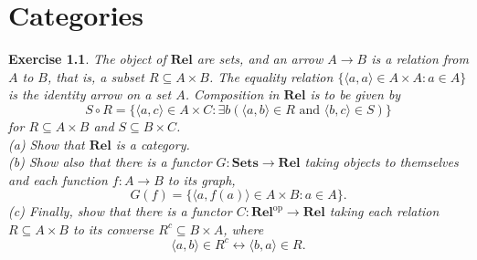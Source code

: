 \documentclass[a4paper, 11pt]{book}
\theoremstyle{plain}
\newtheorem{exercise}{Exercise}[chapter]
\theoremstyle{plain}
\newcommand{\mb}{\mathbf}
\newcommand{\arr}{\rightarrow}
\newcommand{\op}{\text{op}}
\begin{document}
\chapter{Categories}
  \label{sec:ex1ch1}
  \begin{exercise}
    The object of $\mb{Rel}$ are sets, and an arrow $A \arr B$ is a relation from $A$ to $B$, that is, a subset $R \subseteq A \times B$. The equality relation $\{ \langle a, a \rangle \in A \times A: a \in A \}$ is the identity arrow on a set $A$. Composition in $\mb{Rel}$ is to be given by $$ S \circ R=\{ \langle a , c \rangle \in A \times C: \exists b (\langle a,b \rangle \in R \text{ and } \langle b,c \rangle \in S)\}$$ for $R \subseteq A \times B$ and $S \subseteq B \times C$. \\
    (a) Show that $\mb{Rel}$ is a category. \\
    (b) Show also that there is a functor $G: \mb{Sets} \arr \mb{Rel}$ taking objects to themselves and each function $f:A \arr B$ to its graph, $$G(f)=\{ \langle a, f(a) \rangle \in A \times B: a \in A\}.$$ 
    (c) Finally, show that there is a functor $C:\mb{Rel}^\op \rightarrow \mb{Rel}$ taking each relation $R \subseteq A \times B$ to its converse $R^c \subseteq B \times A$, where $$\langle a,b \rangle \in R^c \leftrightarrow \langle b,a \rangle \in R.$$
  \end{exercise}
\end{document}
